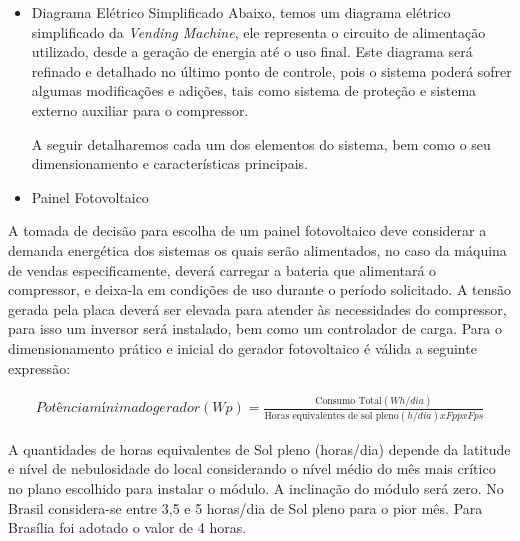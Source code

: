   \begin{itemize}
    \item Diagrama Elétrico Simplificado
    	Abaixo, temos um diagrama elétrico simplificado da \textit{Vending Machine}, ele representa o circuito de alimentação utilizado, desde a geração de energia até o uso final. Este diagrama será refinado e detalhado no último ponto de controle, pois o sistema poderá sofrer algumas modificações e adições, tais como sistema de proteção e sistema externo auxiliar para o compressor.
    

		A seguir detalharemos cada um dos elementos do sistema, bem como o seu dimensionamento e características principais.
        
\end{itemize}
    
            
\begin{itemize}
\item Painel Fotovoltaico
\end{itemize}
		A tomada de decisão para escolha de um painel fotovoltaico deve considerar a demanda energética dos sistemas os quais serão alimentados, no caso da máquina de vendas especificamente, deverá carregar a bateria que alimentará o compressor, e deixa-la em condições de uso durante o período solicitado. A tensão gerada pela placa deverá ser elevada para atender às necessidades do compressor, para isso um inversor será instalado, bem como um controlador de carga.
        Para o dimensionamento prático e inicial do gerador fotovoltaico é válida a seguinte expressão:
        
\begin{eqnarray}
Potência mínima do gerador (Wp) = \frac{\text{Consumo Total}(Wh/dia) }{\text{Horas equivalentes de sol pleno} (h/dia) x Fpp x Fps}
\end{eqnarray}

        A quantidades de horas equivalentes de Sol pleno (horas/dia) depende da latitude e nível de nebulosidade do local considerando o nível médio do mês mais crítico no plano escolhido para instalar o módulo. A inclinação do módulo será zero. No Brasil considera-se entre 3,5 e 5 horas/dia de Sol pleno para o pior mês. Para Brasília foi adotado o valor de 4 horas.
        

